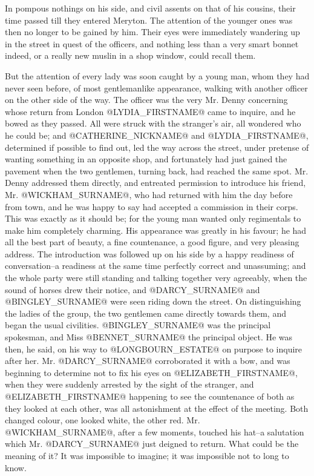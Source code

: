 In pompous nothings on his side, and civil assents on that of his
cousins, their time passed till they entered Meryton. The attention of
the younger ones was then no longer to be gained by him. Their eyes were
immediately wandering up in the street in quest of the officers, and
nothing less than a very smart bonnet indeed, or a really new muslin in
a shop window, could recall them.

But the attention of every lady was soon caught by a young man, whom
they had never seen before, of most gentlemanlike appearance, walking
with another officer on the other side of the way. The officer was
the very Mr. Denny concerning whose return from London @LYDIA_FIRSTNAME@ came
to inquire, and he bowed as they passed. All were struck with the
stranger's air, all wondered who he could be; and @CATHERINE_NICKNAME@ and @LYDIA_FIRSTNAME@,
determined if possible to find out, led the way across the street, under
pretense of wanting something in an opposite shop, and fortunately
had just gained the pavement when the two gentlemen, turning back, had
reached the same spot. Mr. Denny addressed them directly, and entreated
permission to introduce his friend, Mr. @WICKHAM_SURNAME@, who had returned with
him the day before from town, and he was happy to say had accepted a
commission in their corps. This was exactly as it should be; for the
young man wanted only regimentals to make him completely charming.
His appearance was greatly in his favour; he had all the best part of
beauty, a fine countenance, a good figure, and very pleasing address.
The introduction was followed up on his side by a happy readiness
of conversation--a readiness at the same time perfectly correct and
unassuming; and the whole party were still standing and talking together
very agreeably, when the sound of horses drew their notice, and @DARCY_SURNAME@
and @BINGLEY_SURNAME@ were seen riding down the street. On distinguishing the
ladies of the group, the two gentlemen came directly towards them, and
began the usual civilities. @BINGLEY_SURNAME@ was the principal spokesman, and
Miss @BENNET_SURNAME@ the principal object. He was then, he said, on his way to
@LONGBOURN_ESTATE@ on purpose to inquire after her. Mr. @DARCY_SURNAME@ corroborated
it with a bow, and was beginning to determine not to fix his eyes
on @ELIZABETH_FIRSTNAME@, when they were suddenly arrested by the sight of the
stranger, and @ELIZABETH_FIRSTNAME@ happening to see the countenance of both as they
looked at each other, was all astonishment at the effect of the meeting.
Both changed colour, one looked white, the other red. Mr. @WICKHAM_SURNAME@,
after a few moments, touched his hat--a salutation which Mr. @DARCY_SURNAME@ just
deigned to return. What could be the meaning of it? It was impossible to
imagine; it was impossible not to long to know.

